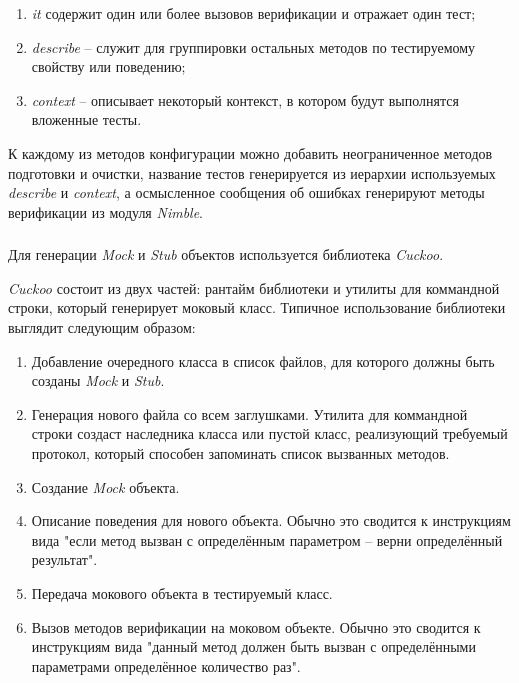 \begin{enumerate}
	\item \textit{it} содержит один или более вызовов верификации и отражает один тест;
	\item \textit{describe} -- служит для группировки остальных методов по тестируемому свойству или поведению;
	\item \textit{context} -- описывает некоторый контекст, в котором будут выполнятся вложенные тесты.
\end{enumerate}

К каждому из методов конфигурации можно добавить неограниченное методов подготовки и очистки, название тестов генерируется из иерархии используемых \textit{describe} и \textit{context}, а осмысленное сообщения об ошибках генерируют методы верификации из модуля \textit{Nimble}.

\subsubsection{}
\label{sec:testing:tech:cuckoo}
Для генерации \textit{Mock} и \textit{Stub} объектов используется библиотека \textit{Cuckoo}.

\textit{Cuckoo} состоит из двух частей: рантайм библиотеки и утилиты для коммандной строки, который генерирует моковый класс. Типичное использование библиотеки выглядит следующим образом:

\begin{enumerate}
	\item Добавление очередного класса в список файлов, для которого должны быть созданы \textit{Mock} и \textit{Stub}.
	\item Генерация нового файла со всем заглушками. Утилита для коммандной строки создаст наследника класса или пустой класс, реализующий требуемый протокол, который способен запоминать список вызванных методов.
	\item Создание \textit{Mock} объекта.
	\item Описание поведения для нового объекта. Обычно это сводится к инструкциям вида "если метод вызван с определённым параметром -- верни определённый результат".
	\item Передача мокового объекта в тестируемый класс.
	\item Вызов методов верификации на моковом объекте. Обычно это сводится к инструкциям вида "данный метод должен быть вызван с определёнными параметрами определённое количество раз".
\end{enumerate}

